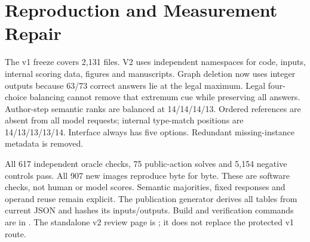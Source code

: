 \documentclass[10pt,letterpaper]{article}
\begin{document}
\section{Reproduction and Measurement Repair}
The v1 freeze covers 2,131 files. V2 uses independent namespaces for
code, inputs, internal scoring data, figures and manuscripts.
Graph deletion now uses integer outputs because 63/73 correct answers
lie at the legal maximum. Legal four-choice balancing cannot remove
that extremum cue while preserving all answers.
Author-step semantic ranks are balanced at 14/14/14/13.
Ordered references are absent from all model requests; internal
type-match positions are 14/13/13/13/14. Interface always has five
options. Redundant missing-instance metadata is removed.

All 617 independent oracle checks, 75 public-action solves and 5,154
negative controls pass. All 907 new images reproduce byte for byte.
These are software checks, not human or model scores. Semantic
majorities, fixed responses and operand reuse remain explicit.
The publication generator derives all tables from current JSON and
hashes its inputs/outputs. Build and verification commands are in
. The standalone v2 review page is
; it does not replace the protected v1 route.


\end{document}
